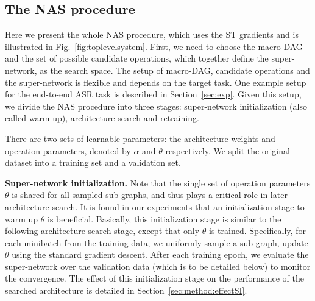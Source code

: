 \documentclass{article}
\newcommand{\figref}{Fig.~\ref}
\newcommand{\secref}{Section~\ref}
\begin{document}
\subsection{The NAS procedure}
\label{sec:method:nasprocedure}
Here we present the whole NAS procedure, which uses the ST gradients and is illustrated in \figref{fig:toplevelsystem}.
First, we need to choose the macro-DAG and the set of possible candidate operations, which together define the super-network, as the search space.
The setup of macro-DAG, candidate operations and the super-network is flexible and depends on the target task.
One example setup for the end-to-end ASR task is described in \secref{sec:exp}.
Given this setup, we divide the NAS procedure into three stages: super-network initialization (also called warm-up), architecture search and retraining.

There are two sets of learnable parameters: the architecture weights and operation parameters, denoted by $\alpha$ and $\theta$ respectively.
We split the original dataset into a training set and a validation set.

\textbf{Super-network initialization.}
Note that the single set of operation parameters $\theta$ is shared for all sampled sub-graphs, and thus plays a critical role in later architecture search.
It is found in our experiments that an initialization stage to warm up $\theta$ is beneficial.
Basically, this initialization stage is similar to the following architecture search stage, except that only $\theta$ is trained.
Specifically, for each minibatch from the training data, we uniformly sample a sub-graph, update $\theta$ using the standard gradient descent.
After each training epoch, we evaluate the super-network over the validation data (which is to be detailed below) to monitor the convergence.
The effect of this initialization stage on the performance of the searched architecture is detailed in \secref{sec:method:effectSI}.
\end{document}

